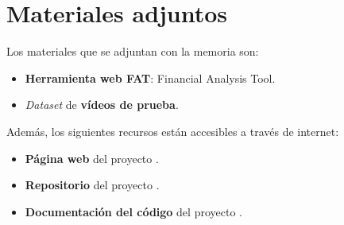 \section{Materiales adjuntos}\label{materiales-adjuntos}

Los materiales que se adjuntan con la memoria son: 

\begin{itemize}
\tightlist
\item
	\textbf{Herramienta web FAT}: Financial Analysis Tool.
\item	
	\emph{Dataset} de \textbf{vídeos de prueba}.
\end{itemize}

Además, los siguientes recursos están accesibles a través de internet:

\begin{itemize}
\tightlist
\item
  \textbf{Página web} del proyecto \citep{online:FAT_web}.
\item
  \textbf{Repositorio} del proyecto \citep{online:FAT_repo}.
\item
  \textbf{Documentación del código} del proyecto \citep{online:FAT_read_docs}.
\end{itemize}


